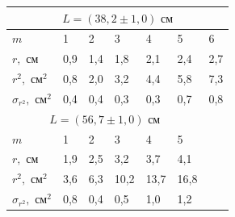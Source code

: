 \documentclass[a4paper,12pt]{article} %
\begin{document}
\begin{table}[h!]
\begin{tabular}{|lllllll}
\hline
\multicolumn{7}{|c|}{$L   = (38,2 \pm 1,0) \text{ см}$}                                                                                                                                                                 \\ \hline
\multicolumn{1}{|l|}{$m$}                        & \multicolumn{1}{l|}{1}    & \multicolumn{1}{l|}{2}    & \multicolumn{1}{l|}{3}    & \multicolumn{1}{l|}{4}    & \multicolumn{1}{l|}{5}    & \multicolumn{1}{l|}{6}   \\ \hline
\multicolumn{1}{|l|}{$r, \text{ см}$}            & \multicolumn{1}{l|}{0,9}  & \multicolumn{1}{l|}{1,4}  & \multicolumn{1}{l|}{1,8}  & \multicolumn{1}{l|}{2,1}  & \multicolumn{1}{l|}{2,4}  & \multicolumn{1}{l|}{2,7} \\ \hline
\multicolumn{1}{|l|}{$r^2, \text{ см}^2$}        & \multicolumn{1}{l|}{0,8}  & \multicolumn{1}{l|}{2,0}  & \multicolumn{1}{l|}{3,2}  & \multicolumn{1}{l|}{4,4}  & \multicolumn{1}{l|}{5,8}  & \multicolumn{1}{l|}{7,3} \\ \hline
\multicolumn{1}{|l|}{$\sigma_{r^2}, \text{ см}^2$} & \multicolumn{1}{l|}{0,4}  & \multicolumn{1}{l|}{0,4}  & \multicolumn{1}{l|}{0,3}  & \multicolumn{1}{l|}{0,3}  & \multicolumn{1}{l|}{0,7}  & \multicolumn{1}{l|}{0,8} \\ \hline
\multicolumn{6}{|c|}{$L = (56,7 \pm 1,0)   \text{ см}$}                                                                                                                                      &                          \\ \cline{1-6}
\multicolumn{1}{|l|}{$m$}                        & \multicolumn{1}{l|}{1}    & \multicolumn{1}{l|}{2}    & \multicolumn{1}{l|}{3}    & \multicolumn{1}{l|}{4}    & \multicolumn{1}{l|}{5}    &                          \\ \cline{1-6}
\multicolumn{1}{|l|}{$r, \text{ см}$}            & \multicolumn{1}{l|}{1,9}  & \multicolumn{1}{l|}{2,5}  & \multicolumn{1}{l|}{3,2}  & \multicolumn{1}{l|}{3,7}  & \multicolumn{1}{l|}{4,1}  &                          \\ \cline{1-6}
\multicolumn{1}{|l|}{$r^2, \text{ см}^2$}        & \multicolumn{1}{l|}{3,6}  & \multicolumn{1}{l|}{6,3}  & \multicolumn{1}{l|}{10,2} & \multicolumn{1}{l|}{13,7} & \multicolumn{1}{l|}{16,8} &                          \\ \cline{1-6}
\multicolumn{1}{|l|}{$\sigma_{r^2}, \text{ см}^2$} & \multicolumn{1}{l|}{0,8}  & \multicolumn{1}{l|}{0,4}  & \multicolumn{1}{l|}{0,5}  & \multicolumn{1}{l|}{1,0}  & \multicolumn{1}{l|}{1,2}  &                          \\ \cline{1-6}

\end{tabular}
\end{table}
\end{document}
